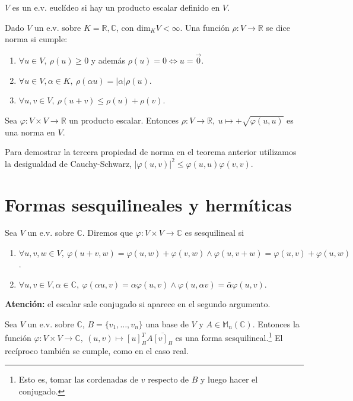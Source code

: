 \documentclass[14pt]{book}
\begin{document}
\begin{dfn}
	$V$ es un e.v. euclídeo si hay un producto escalar definido en $V$.
\end{dfn}

\begin{dfn}[Norma]
	Dado $V$ un e.v. sobre $K = \mathbb{R, C}$, con $\text{dim}_K V < \infty$. Una función $\rho : V \to \mathbb{R}$ se dice norma si cumple:
	\begin{enumerate}
		\item $\forall u \in V,\ \rho(u) \geq 0$ y además $\rho(u) = 0 \iff u = \overrightarrow{0}$.
		\item $\forall u \in V, \alpha \in  K,\ \rho(\alpha u) = |\alpha|\rho(u)$.
		\item $\forall u, v \in V,\ \rho(u + v) \leq \rho(u) + \rho(v)$.
	\end{enumerate}
\end{dfn}

\begin{tm}
	Sea $\varphi : V\times V \to \mathbb{R}$ un producto escalar. Entonces $\rho : V \to \mathbb{R},\ u \mapsto +\sqrt{\varphi(u, u)}$ es una norma en $V$.
\end{tm}
Para demostrar la tercera propiedad de norma en el teorema anterior utilizamos la desigualdad de Cauchy-Schwarz, $|\varphi(u, v)|^2 \leq \varphi(u,u)\varphi(v, v)$.


\section{Formas sesquilineales y hermíticas}

\begin{dfn}
	Sea $V$ un e.v. sobre $\mathbb{C}$. Diremos que $\varphi: V \times V \to \mathbb{C}$ es sesquilineal si
	\begin{enumerate}
		\item $\forall u, v, w \in V,\ \varphi(u + v, w) = \varphi(u, w) + \varphi(v, w) \land \varphi(u, v + w) = \varphi(u, v) + \varphi(u, w)$.
		\item $\forall u, v \in V, \alpha \in \mathbb{C},\ \varphi(\alpha u, v) = \alpha\varphi(u, v) \land \varphi(u, \alpha v) = \bar{\alpha} \varphi(u, v)$.
	\end{enumerate}
	\textbf{Atención:} el escalar sale conjugado si aparece en el segundo argumento.
\end{dfn}

\begin{tm}
	Sea $V$ un e.v. sobre $\mathbb{C}$, $B = \{v_1, \dots, v_n\}$ una base de $V$ y $A \in \mathbb{M}_n(\mathbb{C})$. Entonces la función $\varphi : V \times V \to \mathbb{C},\ (u, v) \mapsto [u]_B^T A \overline{[v]_B}$ es una forma sesquilineal.\footnote{Esto es, tomar las cordenadas de $v$ respecto de $B$ y luego hacer el conjugado.} El recíproco también se cumple, como en el caso real.
\end{tm}
\end{document}
